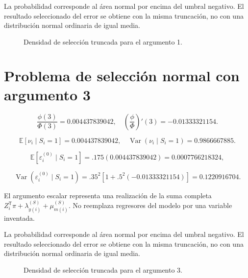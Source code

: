 \documentclass[11pt,a4paper]{article}
\newcommand{\E}{\mathbb E}
\DeclareMathOperator{\Var}{Var}
\begin{document}
La probabilidad corresponde al área normal por encima del umbral negativo. El resultado seleccionado del error se obtiene con la misma truncación, no con una distribución normal ordinaria de igual media.
\begin{figure}[H]\centering{}\caption{Densidad de selección truncada para el argumento 1.}\end{figure}

\clearpage
\section{Problema de selección normal con argumento 3}

\[
\frac{\phi(3)}{\Phi(3)}=0.004437839042,\quad
\left(\frac{\phi}{\Phi}\right)'(3)=-0.01333321154.
\]

\[
\E[\nu_i\mid S_i=1]=0.004437839042,\quad
\Var(\nu_i\mid S_i=1)=0.9866667885.
\]

\[
\E[\varepsilon_i^{(0)}\mid S_i=1]=.175(0.004437839042)=0.0007766218324,
\]

\[
\Var(\varepsilon_i^{(0)}\mid S_i=1)=.35^2[1+.5^2(-0.01333321154)]=0.1220916704.
\]

El argumento escalar representa una realización de la suma completa $Z_i^{\mathsf T}\pi+\lambda_{y(i)}^{(S)}+\mu_{m(i)}^{(S)}$. No reemplaza regresores del modelo por una variable inventada.

La probabilidad corresponde al área normal por encima del umbral negativo. El resultado seleccionado del error se obtiene con la misma truncación, no con una distribución normal ordinaria de igual media.
\begin{figure}[H]\centering{}\caption{Densidad de selección truncada para el argumento 3.}\end{figure}
\end{document}
